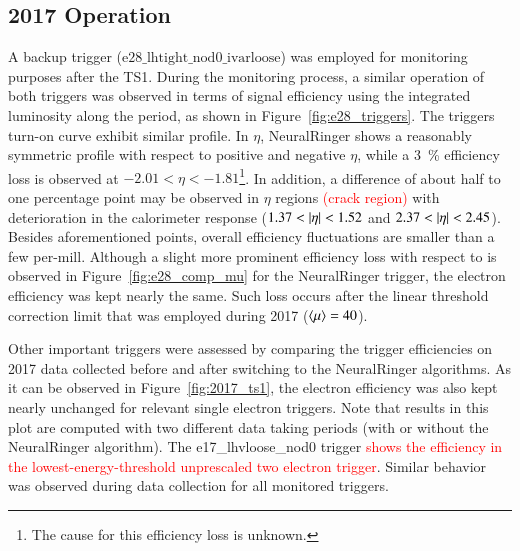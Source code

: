 \subsection{2017 Operation}\label{ssec:2017_ringer_operation}


A backup trigger ($\text{e28\_lhtight\_nod0\_ivarloose}$) was employed for
monitoring purposes after the TS1. During the monitoring process, a similar
operation of both triggers was observed in terms of signal efficiency using the
integrated luminosity along the period, as shown in
Figure~\ref{fig:e28_triggers}. The triggers
turn-on curve exhibit similar profile. In $\eta$, NeuralRinger shows a reasonably symmetric
profile with respect to positive and negative $\eta$, while a
\SI{3}{\%} efficiency loss is observed at $-2.01<\eta<-1.81$\footnote{The cause for this efficiency loss is unknown.}. In addition, a difference of about
half to one percentage point may be observed in $\eta$ regions \textcolor{red}{(crack region)} with deterioration in the calorimeter
response ($1.37 < \abseta < 1.52$ and $2.37 < \abseta < 2.45$). Besides
aforementioned points, overall efficiency fluctuations are smaller than a few
per-mill. Although a slight more prominent efficiency loss with respect to
\avgmu{} is observed in Figure~\ref{fig:e28_comp_mu} for the NeuralRinger trigger, the
electron efficiency was kept nearly the same. Such loss occurs after the
linear threshold correction limit that was employed during 2017 ($\langle \mu \rangle=40$).

Other important triggers were assessed by comparing the trigger efficiencies on
2017 data collected before and after switching to the NeuralRinger algorithms. As it can be
observed in Figure~\ref{fig:2017_ts1}, the electron efficiency was also kept
nearly unchanged for relevant single electron triggers. Note that results in
this plot are computed with two different data taking periods (with or
without the NeuralRinger algorithm). The e17\_lhvloose\_nod0 trigger \textcolor{red}{shows the efficiency in the lowest-energy-threshold unprescaled two electron trigger}.
Similar behavior was observed during data collection for all monitored triggers.



